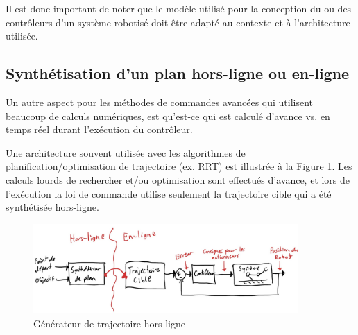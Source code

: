 Il est donc important de noter que le modèle utilisé pour la conception du ou des contrôleurs d'un système robotisé doit être adapté au contexte et à l'architecture utilisée.


\subsection{Synthétisation d'un plan hors-ligne ou en-ligne}

Un autre aspect pour les méthodes de commandes avancées qui utilisent beaucoup de calculs numériques, est qu'est-ce qui est calculé d'avance vs. en temps réel durant l'exécution du contrôleur.

Une architecture souvent utilisée avec les algorithmes de planification/optimisation de trajectoire (ex. RRT) est illustrée à la Figure \ref{fig:offlinetrajectorygeneration}. Les calculs lourds de rechercher et/ou optimisation sont effectués d'avance, et lors de l'exécution la loi de commande utilise seulement la trajectoire cible qui a été synthétisée hors-ligne.
\begin{figure}[htbp]
	\centering
	\includegraphics[width=0.9\textwidth]{fig/offlinetrajectorygeneration.jpg}
	\caption{Générateur de trajectoire hors-ligne}
	\label{fig:offlinetrajectorygeneration}
\end{figure}

